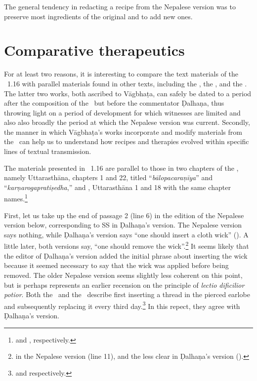  The general tendency in redacting a recipe from the Nepalese version was to
preserve most ingredients of the original and to add new ones.
    

\section{Comparative therapeutics} 

For at least two reasons, it is interesting to compare the text materials of the
\SS~1.16 with parallel materials found in other texts, including the \CS, the \AS,
and the \AHS. The latter two works, both ascribed to Vāgbhaṭa, can safely be dated
to a period after the composition of the \SS\ but before the commentator Ḍalhaṇa,
thus throwing light on a period of development for which witnesses are limited and
also also broadly the period at which the Nepalese version was current. Secondly,
the manner in which Vāgbhaṭa's works incorporate and modify materials from the
\SS\ can help us to understand how recipes and therapies evolved within specific
lines of textual transmission.

The materials presented in \SS~1.16 are parallel to those in two chapters of the
\AS, namely Uttarasthāna, chapters 1 and 22, titled “\emph{bālopacaraṇīya}” and
“\emph{karṇarogapratiṣedha},” and \AHS, Uttarasthāna 1 and 18 with the same chapter
names.\footnote{\cite[619--629 and 734--744]{atha-1980} and \cite[777--781 and  
837--841]{kunt-1939}, respectively.}

First, let us take up the end of passage 2 (line 6) in the edition of the Nepalese
version below, corresponding to SS  in Ḍalhaṇa's version. %
The Nepalese version says nothing, while Ḍalhaṇa's version says “one should insert
a cloth wick” ().  A little later, both versions say,
“one should remove the wick”.\footnote{ in the Nepalese
    version (line 11), and the less clear  in Ḍalhaṇa's
    version ().}  It seems likely that the editor of Ḍalhaṇa's version
    added the initial phrase about inserting the wick because it seemed necessary to
    say that the wick was applied before being removed.  The older Nepalese version
    seems slightly less coherent on this point, but is perhaps represents an earlier
    recension on the principle of \emph{lectio dificilior potior}. %
    Both the \AS\ and the \AHS\ describe first inserting a thread in the pierced
    earlobe and subsequently replacing it every third
    day.\footnote{ and  respectively.} In this
        repect, they agree  with Ḍalhaṇa’s version.


